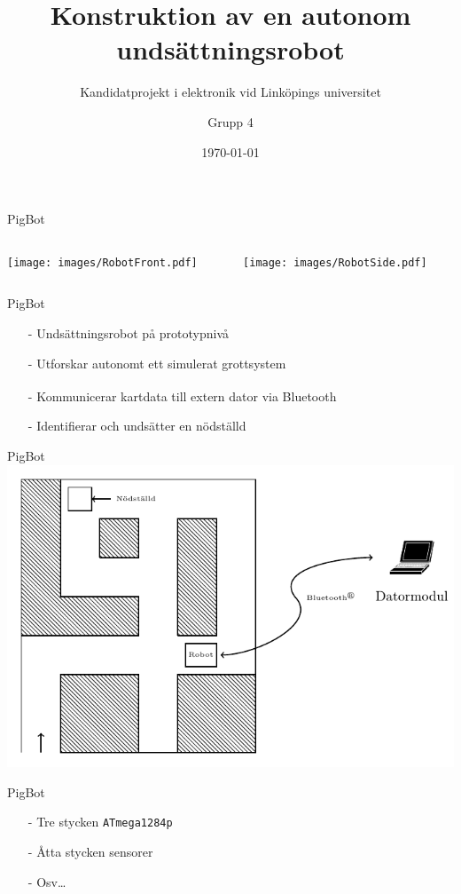 \usepackage{extras}


\title{Konstruktion av en autonom undsättningsrobot}
\subtitle{Kandidatprojekt i elektronik vid Linköpings universitet}
\author{Grupp 4}
\beamertemplatenavigationsymbolsempty
\date{\today}



\begin{frame}
  \titlepage
\end{frame}


\begin{frame}{PigBot}
  \begin{columns}
    \begin{column}{0.5\textwidth}
      \texttt{[image: images/RobotFront.pdf]}
    \end{column}%
    \begin{column}{0.5\textwidth}
      \texttt{[image: images/RobotSide.pdf]}
    \end{column}
  \end{columns}
\end{frame}

\begin{frame}[fragile]{PigBot}
  \begin{itemize}
    \item[-] Undsättningsrobot på prototypnivå
\pause
    \item[-] Utforskar autonomt ett simulerat grottsystem
\pause
    \item[-] Kommunicerar kartdata till extern dator via Bluetooth\textsuperscript{\circledR}
\pause
    \item[-] Identifierar och undsätter en nödställd

  \end{itemize}
\end{frame}

\begin{frame}[fragile]{PigBot}
\centering
    \includegraphics[scale=0.7]{images/overview.pdf}


\end{frame}


\begin{frame}[fragile]{PigBot}
  \begin{itemize}
    \item[-] Tre stycken \Verb+ATmega1284p+
\pause
    \item[-] Åtta stycken sensorer
    \item[-] Osv\ldots
  \end{itemize}
\end{frame}





